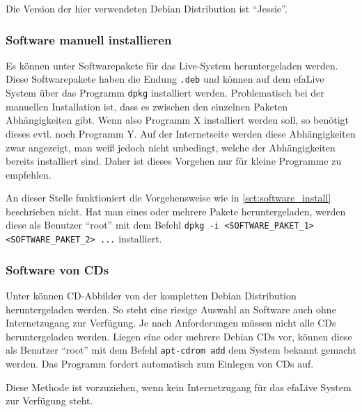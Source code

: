 \documentclass[a4paper,12pt,twoside]{article}
\begin{document}
Die Version der hier verwendeten Debian Distribution ist "`Jessie"'.


\subsubsection{Software manuell installieren}
\label{sct:software_manuell}
Es können unter \cite{DEB3} Softwarepakete für das Live-System
heruntergeladen werden. Diese Softwarepakete haben die Endung
\texttt{.deb} und können auf dem efaLive System
über das Programm \texttt{dpkg} installiert werden. Problematisch bei der
manuellen Installation ist, dass es zwischen den einzelnen Paketen
Abhängigkeiten gibt. Wenn also Programm X installiert werden soll, so
benötigt dieses evtl. noch Programm Y. Auf der Internetseite werden
diese Abhängigkeiten zwar angezeigt, man weiß jedoch nicht unbedingt,
welche der Abhängigkeiten bereits installiert sind. Daher ist dieses
Vorgehen nur für kleine Programme zu empfehlen.

An dieser Stelle funktioniert die Vorgehensweise wie in \ref{sct:software_install}
beschrieben nicht. Hat man eines oder mehrere Pakete heruntergeladen,
werden diese als Benutzer "`root"' mit dem
Befehl \texttt{dpkg -i {\textless}SOFTWARE\_PAKET\_1{\textgreater}
{\textless}SOFTWARE\_PAKET\_2{\textgreater} ...} installiert. 


\subsubsection{Software von CDs}
\label{sct:software_cd}
Unter \cite{DEB4} können CD-Abbilder von der kompletten Debian
Distribution heruntergeladen werden. So steht eine riesige Auswahl an
Software auch ohne Internetzugang zur Verfügung. Je nach Anforderungen
müssen nicht alle CDs heruntergeladen werden. Liegen eine oder mehrere
Debian CDs vor, können diese als Benutzer
"`root"' mit dem Befehl
\texttt{apt-cdrom add} dem System bekannt gemacht
werden. Das Programm fordert automatisch zum Einlegen von CDs auf.

Diese Methode ist vorzuziehen, wenn kein Internetzugang für das efaLive
System zur Verfügung steht.
\end{document}
